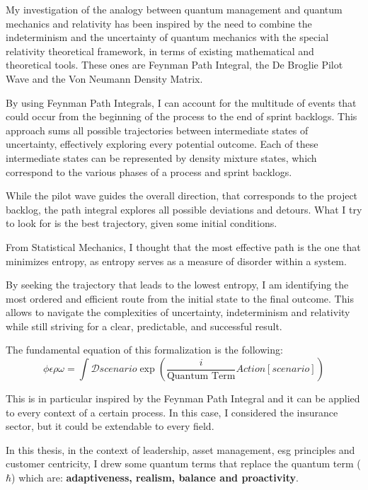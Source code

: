 \documentclass{article}
\begin{document}
My investigation of the analogy between quantum management and quantum mechanics and relativity has been inspired by the need to combine the indeterminism and the uncertainty of quantum mechanics with the special relativity theoretical framework, in terms of existing mathematical and theoretical tools. These ones are Feynman Path Integral, the De Broglie Pilot Wave and the Von Neumann Density Matrix.

By using Feynman Path Integrals, I can account for the multitude of events that could occur from the beginning of the process to the end of sprint backlogs. This approach sums all possible trajectories between intermediate states of uncertainty, effectively exploring every potential outcome. Each of these intermediate states can be represented by density mixture states, which correspond to the various phases of a process and sprint backlogs.

While the pilot wave guides the overall direction, that corresponds to the project backlog, the path integral explores all possible deviations and detours. What I try to look for is the best trajectory, given some initial conditions.

From Statistical Mechanics, I thought that the most effective path is the one that minimizes entropy, as entropy serves as a measure of disorder within a system. 

By seeking the trajectory that leads to the lowest entropy, I am identifying the most ordered and efficient route from the initial state to the final outcome. This allows to navigate the complexities of uncertainty, indeterminism and relativity while still striving for a clear, predictable, and successful result.

The fundamental equation of this formalization is the following:
\begin{equation}
    \phi \epsilon \rho \omega = \int \mathcal{D}scenario \exp\left( \frac{i}{\text{Quantum Term}} Action[scenario] \right)
\end{equation}

This is in particular inspired by the Feynman Path Integral and it can be applied to every context of a certain process. In this case, I considered the insurance sector, but it could be extendable to every field.

In this thesis, in the context of leadership, asset management, esg principles and customer centricity, I drew some quantum terms that replace the quantum term ($\hbar$) which are:
\textbf{adaptiveness, realism, balance and proactivity}.
\end{document}
